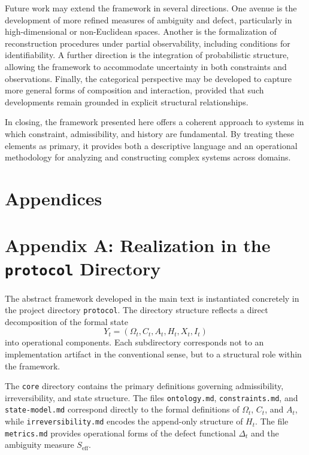 \documentclass[11pt,oneside]{article}
\begin{document}
Future work may extend the framework in several directions. One avenue is the development of more refined measures of ambiguity and defect, particularly in high-dimensional or non-Euclidean spaces. Another is the formalization of reconstruction procedures under partial observability, including conditions for identifiability. A further direction is the integration of probabilistic structure, allowing the framework to accommodate uncertainty in both constraints and observations. Finally, the categorical perspective may be developed to capture more general forms of composition and interaction, provided that such developments remain grounded in explicit structural relationships.

In closing, the framework presented here offers a coherent approach to systems in which constraint, admissibility, and history are fundamental. By treating these elements as primary, it provides both a descriptive language and an operational methodology for analyzing and constructing complex systems across domains.

\newpage
\section*{Appendices}

\appendix

\section{Appendix A: Realization in the \texttt{protocol} Directory}

The abstract framework developed in the main text is instantiated concretely in the project directory \texttt{protocol}. The directory structure reflects a direct decomposition of the formal state
\[
Y_t = (\Omega_t, C_t, A_t, H_t, X_t, I_t)
\]
into operational components. Each subdirectory corresponds not to an implementation artifact in the conventional sense, but to a structural role within the framework.

The \texttt{core} directory contains the primary definitions governing admissibility, irreversibility, and state structure. The files \texttt{ontology.md}, \texttt{constraints.md}, and \texttt{state-model.md} correspond directly to the formal definitions of \( \Omega_t \), \( C_t \), and \( A_t \), while \texttt{irreversibility.md} encodes the append-only structure of \( H_t \). The file \texttt{metrics.md} provides operational forms of the defect functional \( \Delta_t \) and the ambiguity measure \( S_{\mathrm{eff}} \).
\end{document}
